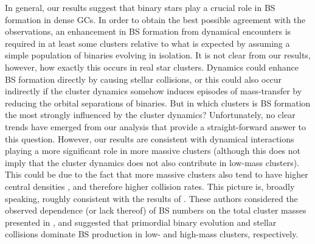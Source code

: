 In general, our results suggest that binary stars play a crucial role
in BS formation in dense GCs.  
In order to obtain the best possible agreement with the observations,
an enhancement in BS formation from dynamical encounters is required
in at least some clusters relative to what is expected by assuming a
simple population of binaries evolving in isolation.  It is not clear
from our results, however, how exactly this occurs in real star
clusters.  Dynamics could enhance BS
formation directly by causing stellar collisions, or this could
also occur indirectly if the cluster dynamics somehow induces episodes of
mass-transfer by reducing the orbital 
separations of binaries.  But in which clusters is
BS formation the most strongly influenced by the cluster dynamics?
Unfortunately, no clear trends have emerged from our analysis that
provide a straight-forward answer to this question.  However, our
results are consistent with dynamical interactions 
playing a more significant role in more massive clusters (although
this does not imply that the cluster dynamics does not also contribute
in low-mass clusters).  This could 
be due to the fact that more massive clusters also tend to have higher
central densities \citep[e.g.][]{djorgovski94}, and therefore
higher collision rates.  This picture is, broadly speaking, roughly
consistent with 
the results of \citet{davies04}.  These authors considered the observed
dependence (or lack thereof) of BS numbers on the total cluster masses
presented in \citet{piotto04}, and suggested that primordial binary
evolution and stellar collisions dominate BS production in low- and
high-mass clusters, respectively.

